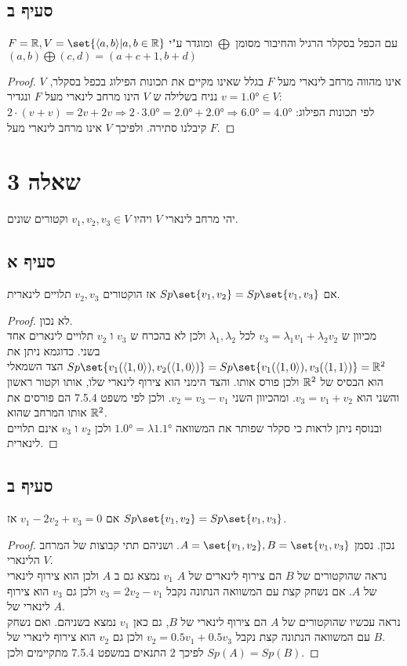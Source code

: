 \documentclass{article}
\DeclarePairedDelimiter\set\{\}
\begin{document}
	\subsection*{סעיף ב}
	$F = \RR, V = \set{\ang{a,b} | a,b \in \RR}$ עם הכפל בסקלר הרגיל והחיבור מסומן $\bigoplus$ ומוגדר ע"י $(a,b)\bigoplus(c,d) = (a+c+1, b+d)$
	\begin{proof}
		$V$ אינו מהווה מרחב לינארי מעל $F$ בגלל שאינו מקיים את תכונות הפילוג בכפל בסקלר, נניח בשלילה ש $V$ הינו מרחב לינארי מעל $F$ ונגדיר $v = \ang{1,0} \in V$: \\
		לפי תכונות הפילוג: $2 \cdot (v + v) = 2v + 2v \Rightarrow 2 \cdot \ang{3,0 } = \ang{2,0} + \ang{2,0} \Rightarrow \ang{6,0} = \ang{4,0}$
		קיבלנו סתירה. ולפיכך $V$ אינו מרחב לינארי מעל $F$.
	\end{proof}

	\pagebreak

	\section*{שאלה 3}
	יהי מרחב לינארי $V$ ויהיו $v_1,v_2,v_3 \in V$ וקטורים שונים. \\
	\subsection*{סעיף א}
		אם $Sp\set{v_1, v_2} = Sp\set{v_1, v_3}$ אז הוקטורים $v_2, v_3$ תלויים לינארית.
		\begin{proof}
			לא נכון. \\
			 מכיוון ש $v_3 = \lambda_1 v_1 + \lambda_2 v_2$ לכל $\lambda_1, \lambda_2$ ולכן לא בהכרח ש $v_3$ ו $v_2$ תלויים לינארים אחד בשני.
			כדוגמא ניתן את $Sp\set{v_1(\ang{1,0}), v_2(\ang{1,0})}=Sp\set{v_1(\ang{1,0}), v_3(\ang{1,1})} = \RR^2$
			הצד השמאלי הוא הבסיס של $\mathbb{R}^2$ ולכן פורס אותו. והצד הימני הוא צירוף לינארי שלו, אותו וקטור ראשון והשני הוא $v_3 = v_1 + v_2$.
			ומהכיוון השני $v_2 = v_3 - v_1$. ולכן לפי משפט 7.5.4 הם פורסים את אותו המרחב שהוא $\mathbb{R}^2$. \\
			ובנוסף ניתן לראות כי סקלר שפותר את המשוואה $\ang{1,0} = \lambda \ang{1,1}$ ולכן $v_2$ ו $v_3$ אינם תלויים לינארית.
		\end{proof}

		\subsection*{סעיף ב}
		אם $v_1 - 2v_2 + v_3 = 0$ אז $Sp\set{v_1, v_2} = Sp\set{v_1, v_3}$.
		\begin{proof}
			נכון.
			נסמן $A = \set{v_1, v_2}, B = \set{v_1, v_3}$. ושניהם תתי קבוצות של המרחב הלינארי $V$. \\
			נראה שהוקטורים של $B$ הם צירוף לינארים של $A$ $v_1$ נמצא גם ב $A$ ולכן הוא צירוף לינארי של $A$. אם נשחק קצת עם המשוואה הנתונה נקבל $v_3 = 2v_2 - v_1$ ולכן גם $v_3$ הוא צירוף לינארי של $A$.  \\
			נראה עכשיו שהוקטורים של $A$ הם צירוף לינארי של $B$, גם כאן $v_1$ נמצא בשניהם. ואם נשחק עם המשוואה הנתונה קצת נקבל $v_2 = 0.5v_1 + 0.5v_3$ ולכן גם $v_2$ הוא צירוף לינארי של $B$. \\
			לפיכך 2 התנאים במשפט 7.5.4 מתקיימים ולכן $Sp(A) = Sp(B)$.

		\end{proof}
\end{document}
